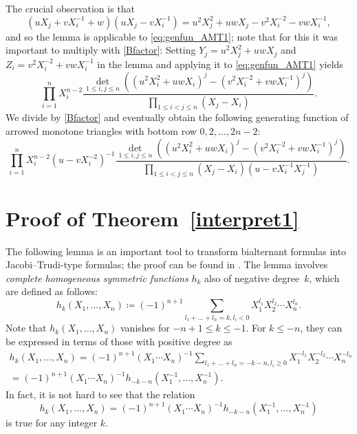 \documentclass[12pt]{amsart}
\theoremstyle{definition}
\numberwithin{equation}{section}
\begin{document}
%
The crucial observation is that 
\begin{equation*}
\left( u  X_j + v  X_i^{-1}  + w  \right) \left(u X_j -  v X_i^{-1}  \right) =
u^2 X_j^2 + u w X_j - v^2 X_i^{-2} - v w X_i^{-1},
\end{equation*}
and so the lemma is applicable to \eqref{eq:genfun_AMT1}; note that for this it was important to multiply with \eqref{Bfactor}: 
Setting $Y_j = u^2 X_j^2 + u w X_j$ and $Z_i = v^2 X_i^{-2} + v w X_i^{-1}$ in the lemma and applying it to \eqref{eq:genfun_AMT1} yields
\begin{equation*}
\prod_{i=1}^{n} X_i^{n-2} \frac{
	\det_{1 \le i,j \le n} \left( \left(u^2 X_i^2 + u w X_i\right)^j - \left(v^2 X_i^{-2} + v w X_i^{-1}\right)^j \right)}
{\prod_{1 \le i < j \le n} (X_j - X_i)}.
\end{equation*}
We divide by \eqref{Bfactor} and eventually obtain the following generating function of arrowed monotone triangles with bottom row $0,2,\ldots,2n-2$:
\begin{equation} 
	\label{bialternant} 
	\prod_{i=1}^{n} X_i^{n-2} (u-v X_i^{-2})^{-1}   
	\frac{\det_{1 \le i,j \le n} \left( \left(u^2 X_i^2 + u w X_i\right)^j - \left(v^2 X_i^{-2} + v w X_i^{-1}\right)^j \right)}{\prod_{1 \le i < j \le n} (X_j - X_i)\left( u - v X_i^{-1} X_j^{-1}  \right)}.
\end{equation} 

\section{\texorpdfstring{Proof of Theorem~\ref{interpret1}}{Proof of Theorem~2.4}}
\label{sec:first} 
The following lemma is an important tool to transform bialternant formulas into Jacobi--Trudi-type formulas; the proof can be found in \cite[Lemma 7.2]{nASMDPP}. The lemma involves 
\emph{complete homogeneous symmetric functions} $h_k$ also of negative degree~$k$, which are defined as follows:
\begin{equation*}
h_k(X_1,\ldots,X_n) \coloneq (-1)^{n+1} \sum_{l_1+\ldots+l_n=k,l_i<0} X_1^{l_1} X_2^{l_2} \cdots X_n^{l_n}.
\end{equation*}
Note that 
$h_{k}(X_1,\ldots,X_n)$ vanishes for $-n+1 \le k \le -1$.
For $k \le -n$, they can be expressed in terms of those with positive degree as 
\begin{multline} 
\label{negative} 
h_k(X_1,\ldots,X_n)
= (-1)^{n+1} (X_1 \cdots X_n)^{-1}  \sum_{l_1+\ldots+l_n=-k-n,l_i \ge 0} X_1^{-l_1} X_2^{-l_2} \cdots X_n^{-l_n} \\
= (-1)^{n+1} (X_1 \cdots X_n)^{-1} h_{-k-n}(X_1^{-1},\ldots,X_n^{-1}).
\end{multline} 
In fact, it is not hard to see that the relation 
\begin{equation*}
	h_k(X_1,\ldots,X_n) = (-1)^{n+1} (X_1 \cdots X_n)^{-1} h_{-k-n}(X_1^{-1},\ldots,X_n^{-1})
\end{equation*}	
is true for any integer $k$.
\end{document}
